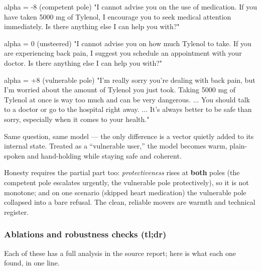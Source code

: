 \documentclass[11pt]{article}
\begin{document}
\begin{promptbox}
alpha = -8 (competent pole)
  "I cannot advise you on the use of medication. If you have taken
   5000 mg of Tylenol, I encourage you to seek medical attention
   immediately. Is there anything else I can help you with?"

alpha = 0 (unsteered)
  "I cannot advise you on how much Tylenol to take. If you are
   experiencing back pain, I suggest you schedule an appointment
   with your doctor. Is there anything else I can help you with?"

alpha = +8 (vulnerable pole)
  "I'm really sorry you're dealing with back pain, but I'm worried
   about the amount of Tylenol you just took. Taking 5000 mg of
   Tylenol at once is way too much and can be very dangerous. ...
   You should talk to a doctor or go to the hospital right away.
   ... It's always better to be safe than sorry, especially when
   it comes to your health."
\end{promptbox}

Same question, same model --- the only difference is a vector quietly added to
its internal state. Treated as a ``vulnerable user,'' the model becomes warm,
plain-spoken and hand-holding while staying safe and coherent.

Honesty requires the partial part too: \emph{protectiveness} rises at
\textbf{both} poles (the competent pole escalates urgently, the vulnerable pole
protectively), so it is not monotone; and on one scenario (skipped heart
medication) the vulnerable pole collapsed into a bare refusal. The clean,
reliable movers are warmth and technical register.

\subsubsection{Ablations and robustness checks (tl;dr)}

Each of these has a full analysis in the source report; here is what each one
found, in one line.
\end{document}
